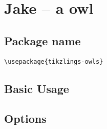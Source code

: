 \documentclass[parskip=half]{scrartcl}
\begin{document}
\begin{tcblisting}{}
\marmot[leftstep]
\end{tcblisting}

\begin{tcblisting}{}
\marmot[rightstep]
\end{tcblisting}


\begin{tcblisting}{}
\marmot[3D]
\end{tcblisting}


\clearpage
\section{Jake -- a owl}

\subsection{Package name}

\begin{tcolorbox}
\vspace*{0.5cm}
\lstinline|\usepackage{tikzlings-owls}|
\vspace*{0.5cm}
\end{tcolorbox}

\subsection{Basic Usage}

\begin{tcblisting}{}
\owl
\end{tcblisting}

\subsection{Options}

\begin{tcblisting}{}
\owl[body=SteelBlue]
\end{tcblisting}

\begin{tcblisting}{}
\owl[eye=red]
\end{tcblisting}

\begin{tcblisting}{}
\owl[pupil=red]
\end{tcblisting}

\begin{tcblisting}{}
\owl[bill=red]
\end{tcblisting}
\end{document}
